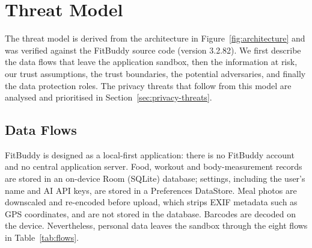 
\section{Threat Model}
\label{sec:threat-model}

The threat model is derived from the architecture in Figure~\ref{fig:architecture} and was
verified against the FitBuddy source code (version 3.2.82). We first describe the data flows
that leave the application sandbox, then the information at risk, our trust assumptions, the
trust boundaries, the potential adversaries, and finally the data protection roles. The privacy
threats that follow from this model are analysed and prioritised in
Section~\ref{sec:privacy-threats}.

\subsection{Data Flows}
FitBuddy is designed as a local-first application: there is no FitBuddy account and no central
application server. Food, workout and body-measurement records are stored in an on-device Room
(SQLite) database; settings, including the user's name and AI API keys, are stored in a
Preferences DataStore. Meal photos are downscaled and re-encoded before upload, which strips EXIF
metadata such as GPS coordinates, and are not stored in the database. Barcodes are decoded on the
device. Nevertheless, personal data leaves the sandbox through the eight flows in
Table~\ref{tab:flows}.

